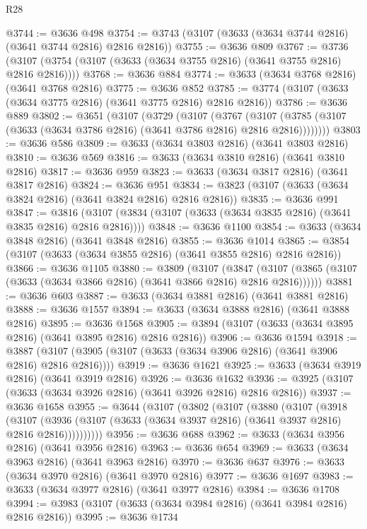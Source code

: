 \begin{lexlean}{R28}
\begin{coremodule}
@3744 := @3636 @498
@3754 := @3743 (@3107 (@3633 (@3634 @3744 @2816) (@3641 @3744 @2816) @2816 @2816))
@3755 := @3636 @809
@3767 := @3736 (@3107 (@3754 (@3107 (@3633 (@3634 @3755 @2816) (@3641 @3755 @2816) @2816 @2816))))
@3768 := @3636 @884
@3774 := @3633 (@3634 @3768 @2816) (@3641 @3768 @2816)
@3775 := @3636 @852
@3785 := @3774 (@3107 (@3633 (@3634 @3775 @2816) (@3641 @3775 @2816) @2816 @2816))
@3786 := @3636 @889
@3802 := @3651
    (@3107
      (@3729
        (@3107
          (@3767
            (@3107 (@3785 (@3107 (@3633 (@3634 @3786 @2816) (@3641 @3786 @2816) @2816 @2816))))))))
@3803 := @3636 @586
@3809 := @3633 (@3634 @3803 @2816) (@3641 @3803 @2816)
@3810 := @3636 @569
@3816 := @3633 (@3634 @3810 @2816) (@3641 @3810 @2816)
@3817 := @3636 @959
@3823 := @3633 (@3634 @3817 @2816) (@3641 @3817 @2816)
@3824 := @3636 @951
@3834 := @3823 (@3107 (@3633 (@3634 @3824 @2816) (@3641 @3824 @2816) @2816 @2816))
@3835 := @3636 @991
@3847 := @3816 (@3107 (@3834 (@3107 (@3633 (@3634 @3835 @2816) (@3641 @3835 @2816) @2816 @2816))))
@3848 := @3636 @1100
@3854 := @3633 (@3634 @3848 @2816) (@3641 @3848 @2816)
@3855 := @3636 @1014
@3865 := @3854 (@3107 (@3633 (@3634 @3855 @2816) (@3641 @3855 @2816) @2816 @2816))
@3866 := @3636 @1105
@3880 := @3809
    (@3107
      (@3847 (@3107 (@3865 (@3107 (@3633 (@3634 @3866 @2816) (@3641 @3866 @2816) @2816 @2816))))))
@3881 := @3636 @603
@3887 := @3633 (@3634 @3881 @2816) (@3641 @3881 @2816)
@3888 := @3636 @1557
@3894 := @3633 (@3634 @3888 @2816) (@3641 @3888 @2816)
@3895 := @3636 @1568
@3905 := @3894 (@3107 (@3633 (@3634 @3895 @2816) (@3641 @3895 @2816) @2816 @2816))
@3906 := @3636 @1594
@3918 := @3887 (@3107 (@3905 (@3107 (@3633 (@3634 @3906 @2816) (@3641 @3906 @2816) @2816 @2816))))
@3919 := @3636 @1621
@3925 := @3633 (@3634 @3919 @2816) (@3641 @3919 @2816)
@3926 := @3636 @1632
@3936 := @3925 (@3107 (@3633 (@3634 @3926 @2816) (@3641 @3926 @2816) @2816 @2816))
@3937 := @3636 @1658
@3955 := @3644
    (@3107
      (@3802
        (@3107
          (@3880
            (@3107
              (@3918
                (@3107
                  (@3936 (@3107 (@3633 (@3634 @3937 @2816) (@3641 @3937 @2816) @2816 @2816))))))))))
@3956 := @3636 @688
@3962 := @3633 (@3634 @3956 @2816) (@3641 @3956 @2816)
@3963 := @3636 @654
@3969 := @3633 (@3634 @3963 @2816) (@3641 @3963 @2816)
@3970 := @3636 @637
@3976 := @3633 (@3634 @3970 @2816) (@3641 @3970 @2816)
@3977 := @3636 @1697
@3983 := @3633 (@3634 @3977 @2816) (@3641 @3977 @2816)
@3984 := @3636 @1708
@3994 := @3983 (@3107 (@3633 (@3634 @3984 @2816) (@3641 @3984 @2816) @2816 @2816))
@3995 := @3636 @1734

\end{coremodule}
\end{lexlean}
